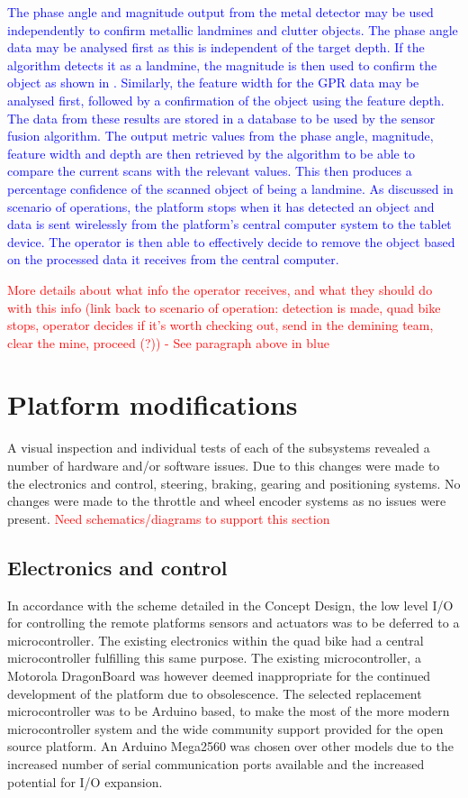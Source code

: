 \documentclass[main.tex]{subfiles}
\begin{document}
\textcolor{blue}{The phase angle and magnitude output from the metal detector may be used independently to confirm metallic landmines and clutter objects. The phase angle data may be analysed first as this is independent of the target depth. If the algorithm detects it as a landmine, the magnitude is then used to confirm the object as shown in . Similarly, the feature width for the GPR data may be analysed first, followed by a confirmation of the object using the feature depth. The data from these results are stored in a database to be used by the sensor fusion algorithm. The output metric values from the phase angle, magnitude, feature width and depth are then retrieved by the algorithm to be able to compare the current scans with the relevant values. This then produces a percentage confidence of the scanned object of being a landmine. As discussed in scenario of operations, the platform stops when it has detected an object and data is sent wirelessly from the platform’s central computer system to the tablet device. The operator is then able to effectively decide to remove the object based on the processed data it receives from the central computer.} 

\textcolor{red}{More details about what info the operator receives, and what they should do with this info (link back to scenario of operation: detection is made, quad bike stops, operator decides if it's worth checking out, send in the demining team, clear the mine, proceed (?)) - See paragraph above in blue}

\section{Platform modifications}
A visual inspection and individual tests of each of the subsystems revealed a number of hardware and/or software issues. Due to this changes were made to the electronics and control, steering, braking, gearing and positioning systems. No changes were made to the throttle and wheel encoder systems as no issues were present. \textcolor{red}{Need schematics/diagrams to support this section}
\subsection{Electronics and control}
In accordance with the scheme detailed in the Concept Design, the low level I/O for controlling the remote platforms sensors and actuators was to be deferred to a microcontroller. The existing electronics within the quad bike had a central microcontroller fulfilling this same purpose. The existing microcontroller, a Motorola DragonBoard was however deemed inappropriate for the continued development of the platform due to obsolescence. The selected replacement microcontroller was to be Arduino based, to make the most of the more modern microcontroller system and the wide community support provided for the open source platform. An Arduino Mega2560 was chosen over other models due to the increased number of serial communication ports available and the increased potential for I/O expansion. 
\end{document}
